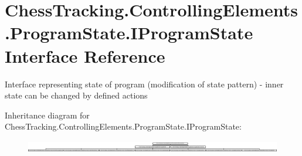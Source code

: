 \hypertarget{interface_chess_tracking_1_1_controlling_elements_1_1_program_state_1_1_i_program_state}{}\section{Chess\+Tracking.\+Controlling\+Elements.\+Program\+State.\+I\+Program\+State Interface Reference}
\label{interface_chess_tracking_1_1_controlling_elements_1_1_program_state_1_1_i_program_state}


Interface representing state of program (modification of state pattern) -\/ inner state can be changed by defined actions  


Inheritance diagram for Chess\+Tracking.\+Controlling\+Elements.\+Program\+State.\+I\+Program\+State\+:\begin{figure}[H]
\begin{center}
\leavevmode
\includegraphics[height=0.518359cm]{interface_chess_tracking_1_1_controlling_elements_1_1_program_state_1_1_i_program_state}
\end{center}
\end{figure}
